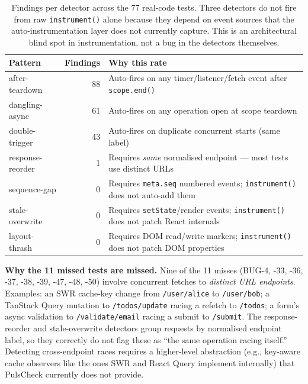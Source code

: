 \documentclass[11pt,a4paper]{article}
\begin{document}
\begin{table}[h]
\centering
\small
\begin{tabular}{lrl}
\toprule
\textbf{Pattern} & \textbf{Findings} & \textbf{Why this rate} \\
\midrule
after-teardown   & 88 & Auto-fires on any timer/listener/fetch event after \texttt{scope.end()} \\
dangling-async   & 61 & Auto-fires on any operation open at scope teardown \\
double-trigger   & 43 & Auto-fires on duplicate concurrent starts (same label) \\
response-reorder & \phantom{0}1  & Requires \emph{same} normalised endpoint --- most tests use distinct URLs \\
sequence-gap     & \phantom{0}0  & Requires \texttt{meta.seq} numbered events; \texttt{instrument()} does not auto-add them \\
stale-overwrite  & \phantom{0}0  & Requires \texttt{setState}/render events; \texttt{instrument()} does not patch React internals \\
layout-thrash    & \phantom{0}0  & Requires DOM read/write markers; \texttt{instrument()} does not patch DOM properties \\
\bottomrule
\end{tabular}
\caption{Findings per detector across the 77 real-code tests. Three detectors do not fire from raw \texttt{instrument()} alone because they depend on event sources that the auto-instrumentation layer does not currently capture. This is an architectural blind spot in instrumentation, not a bug in the detectors themselves.}
\label{tab:detector-fires}
\end{table}

\textbf{Why the 11 missed tests are missed.} Nine of the 11 misses (BUG-4, -33, -36, -37, -38, -39, -47, -48, -50) involve concurrent fetches to \emph{distinct URL endpoints}. Examples: an SWR cache-key change from \texttt{/user/alice} to \texttt{/user/bob}; a TanStack Query mutation to \texttt{/todos/update} racing a refetch to \texttt{/todos}; a form's async validation to \texttt{/validate/email} racing a submit to \texttt{/submit}. The response-reorder and stale-overwrite detectors group requests by normalised endpoint label, so they correctly do not flag these as ``the same operation racing itself.'' Detecting cross-endpoint races requires a higher-level abstraction (e.g., key-aware cache observers like the ones SWR and React Query implement internally) that PulsCheck currently does not provide.
\end{document}
